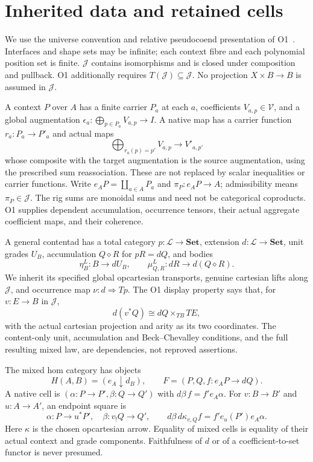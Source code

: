 \documentclass[11pt,a4paper]{article}
\theoremstyle{definition}
\newcommand{\Set}{\mathbf{Set}}
\newcommand{\V}{\mathcal V}
\newcommand{\Lcat}{\mathcal L}
\newcommand{\J}{\mathcal J}
\newcommand{\diamondc}{\mathbin{\diamond}}
\begin{document}
\section{Inherited data and retained cells}\label{sec:data}

We use the universe convention and relative pseudocoend presentation of
O1~\cite{O1}. Interfaces and shape sets may be infinite; each context fibre
and each polynomial position set is finite. $\J$ contains isomorphisms and
is closed under composition and pullback. O1 additionally requires
$T(\J)\subseteq\J$. No projection $X\times B\to B$ is assumed in $\J$.

A context $P$ over $A$ has a finite carrier $P_a$ at each $a$, coefficients
$V_{a,p}\in\V$, and a global augmentation
$\epsilon_a:\bigoplus_{p\in P_a}V_{a,p}\to I$.
A native map has a carrier function $r_a:P_a\to P'_a$ and actual maps
\[
 \bigoplus_{r_a(p)=p'}V_{a,p}\longrightarrow V'_{a,p'}
\]
whose composite with the target augmentation is the source augmentation,
using the prescribed sum reassociation. These are not replaced by scalar
inequalities or carrier functions. Write
$e_AP=\coprod_{a\in A}P_a$ and $\pi_P:e_AP\to A$; admissibility means
$\pi_P\in\J$. The rig sums are monoidal sums and need not be categorical
coproducts. O1 supplies dependent accumulation, occurrence tensors, their
actual aggregate coefficient maps, and their coherence.

A general contentad has a total category $p:\Lcat\to\Set$, extension
$d:\Lcat\to\Set$, unit grades $U_B$, accumulation $Q\diamondc R$ for
$pR=dQ$, and bodies
\[
 \eta^L_B:B\to dU_B,\qquad
 \mu^L_{Q,R}:dR\to d(Q\diamondc R).
\]
We inherit its specified global opcartesian transports, genuine cartesian
lifts along $\J$, and occurrence map $\nu:d\Rightarrow Tp$.
The O1 display property says that, for $v:E\to B$ in $\J$,
\begin{equation}\label{eq:display}
 d(v^*Q)\cong dQ\mathbin{\times}_{TB}TE,
\end{equation}
with the actual cartesian projection and arity as its two coordinates.
The content-only unit, accumulation and Beck--Chevalley conditions, and
the full resulting mixed law, are dependencies, not reproved assertions.

The mixed hom category has objects
\[
 H(A,B)=(e_A\downarrow d_B),\qquad
 F=(P,Q,f:e_AP\to dQ).
\]
A native cell is $(\alpha:P\to P',\beta:Q\to Q')$ with
$d\beta\,f=f'e_A\alpha$.
For $v:B\to B'$ and $u:A\to A'$, an endpoint square is
\begin{equation}\label{eq:endpoint}
 \alpha:P\to u^*P',\quad \beta:v_!Q\to Q',\qquad
 d\beta\,d\kappa_{v,Q}f=f'e_u(P')e_A\alpha.
\end{equation}
Here $\kappa$ is the chosen opcartesian arrow. Equality of mixed cells is
equality of their actual context and grade components. Faithfulness of $d$
or of a coefficient-to-set functor is never presumed.
\end{document}
